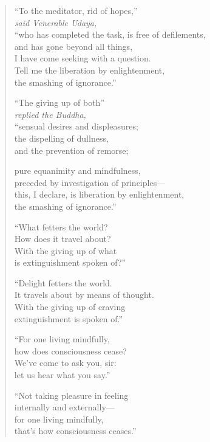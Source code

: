 \documentclass[12pt,openany]{book}%
\newcommand*{\scspeaker}[1]{\hspace{2em}\textit{#1}}
\begin{document}
\begin{verse}%
“To the meditator, rid of hopes,” \\
\scspeaker{said Venerable Udaya, }\\
“who has completed the task, is free of defilements, \\
and has gone beyond all things, \\
I have come seeking with a question. \\
Tell me the liberation by enlightenment, \\
the smashing of ignorance.” 

“The giving up of both” \\
\scspeaker{replied the Buddha, }\\
“sensual desires and displeasures; \\
the dispelling of dullness, \\
and the prevention of remorse; 

pure equanimity and mindfulness, \\
preceded by investigation of principles—\\
this, I declare, is liberation by enlightenment, \\
the smashing of ignorance.” 

“What fetters the world? \\
How does it travel about? \\
With the giving up of what \\
is extinguishment spoken of?” 

“Delight fetters the world. \\
It travels about by means of thought. \\
With the giving up of craving \\
extinguishment is spoken of.” 

“For one living mindfully, \\
how does consciousness cease? \\
We’ve come to ask you, sir: \\
let us hear what you say.” 

“Not taking pleasure in feeling \\
internally and externally—\\
for one living mindfully, \\
that’s how consciousness ceases.” 

%
\end{verse}
\end{document}
